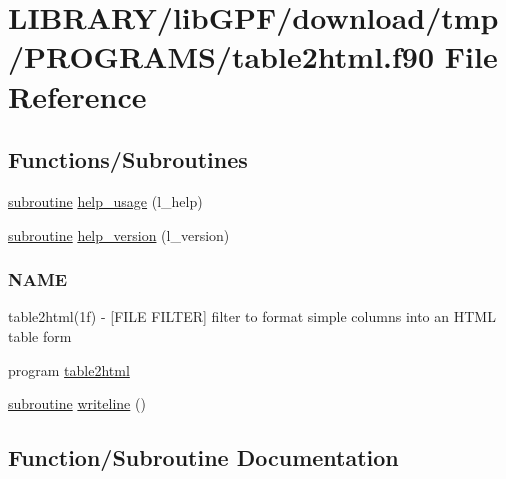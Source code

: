 \hypertarget{table2html_8f90}{}\section{L\+I\+B\+R\+A\+R\+Y/lib\+G\+P\+F/download/tmp/\+P\+R\+O\+G\+R\+A\+M\+S/table2html.f90 File Reference}
\label{table2html_8f90}
\subsection*{Functions/\+Subroutines}
\begin{DoxyCompactItemize}
\item 
\hyperlink{M__stopwatch_83_8txt_acfbcff50169d691ff02d4a123ed70482}{subroutine} \hyperlink{table2html_8f90_a3e09a3b52ee8fb04eeb93fe5761626a8}{help\+\_\+usage} (l\+\_\+help)
\item 
\hyperlink{M__stopwatch_83_8txt_acfbcff50169d691ff02d4a123ed70482}{subroutine} \hyperlink{table2html_8f90_a39c21619b08a3c22f19e2306efd7f766}{help\+\_\+version} (l\+\_\+version)
\begin{DoxyCompactList}\small\item\em \subsubsection*{N\+A\+ME}

table2html(1f) -\/ \mbox{[}F\+I\+LE F\+I\+L\+T\+ER\mbox{]} filter to format simple columns into an H\+T\+ML table form \end{DoxyCompactList}\item 
program \hyperlink{table2html_8f90_ac9fa6313f884ee5cf8caf9b9bfb9f3cd}{table2html}
\item 
\hyperlink{M__stopwatch_83_8txt_acfbcff50169d691ff02d4a123ed70482}{subroutine} \hyperlink{table2html_8f90_a8fd5b1ad7c5297852591499ca1e2db09}{writeline} ()
\end{DoxyCompactItemize}


\subsection{Function/\+Subroutine Documentation}
\mbox{\label{table2html_8f90_a3e09a3b52ee8fb04eeb93fe5761626a8}} 

